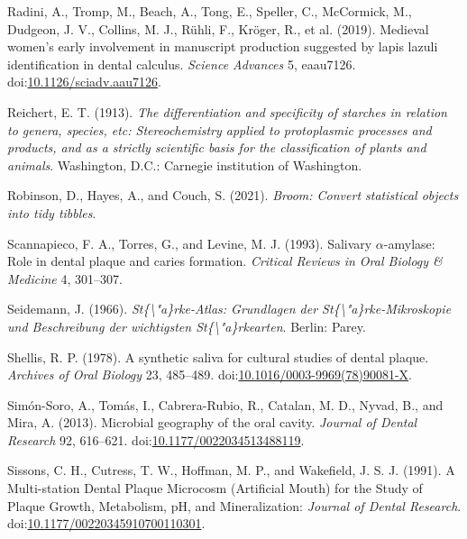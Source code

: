 \documentclass[utf8]{frontiers/frontiersSCNS}
\newlength{\cslhangindent}
\newlength{\cslentryspacingunit} %
\newenvironment{CSLReferences}[2] %
 {%
  \setlength{\parindent}{0pt}
  \ifodd #1
  \let\oldpar\par
  \def\par{\hangindent=\cslhangindent\oldpar}
  \fi
  \setlength{\parskip}{#2\cslentryspacingunit}
 }%
 {}
\begin{document}
\begin{CSLReferences}{1}{0}
\leavevmode{}%
Radini, A., Tromp, M., Beach, A., Tong, E., Speller, C., McCormick, M., Dudgeon, J. V., Collins, M. J., Rühli, F., Kröger, R., et al. (2019). Medieval women's early involvement in manuscript production suggested by lapis lazuli identification in dental calculus. \emph{Science Advances} 5, eaau7126. doi:\href{https://doi.org/10.1126/sciadv.aau7126}{10.1126/sciadv.aau7126}.

\leavevmode{}%
Reichert, E. T. (1913). \emph{The differentiation and specificity of starches in relation to genera, species, etc: Stereochemistry applied to protoplasmic processes and products, and as a strictly scientific basis for the classification of plants and animals}. {Washington, D.C.}: {Carnegie institution of Washington}.

\leavevmode{}%
Robinson, D., Hayes, A., and Couch, S. (2021). \emph{Broom: {Convert} statistical objects into tidy tibbles}.

\leavevmode{}%
Scannapieco, F. A., Torres, G., and Levine, M. J. (1993). Salivary {\(\alpha\)}-amylase: Role in dental plaque and caries formation. \emph{Critical Reviews in Oral Biology \& Medicine} 4, 301--307.

\leavevmode{}%
Seidemann, J. (1966). \emph{St\{\textbackslash"a\}rke-{Atlas}: {Grundlagen} der {St}\{\textbackslash"a\}rke-{Mikroskopie} und {Beschreibung} der wichtigsten {St}\{\textbackslash"a\}rkearten}. {Berlin}: {Parey}.

\leavevmode{}%
Shellis, R. P. (1978). A synthetic saliva for cultural studies of dental plaque. \emph{Archives of Oral Biology} 23, 485--489. doi:\href{https://doi.org/10.1016/0003-9969(78)90081-X}{10.1016/0003-9969(78)90081-X}.

\leavevmode{}%
Simón-Soro, A., Tomás, I., Cabrera-Rubio, R., Catalan, M. D., Nyvad, B., and Mira, A. (2013). Microbial geography of the oral cavity. \emph{Journal of Dental Research} 92, 616--621. doi:\href{https://doi.org/10.1177/0022034513488119}{10.1177/0022034513488119}.

\leavevmode{}%
Sissons, C. H., Cutress, T. W., Hoffman, M. P., and Wakefield, J. S. J. (1991). A {Multi-station Dental Plaque Microcosm} ({Artificial Mouth}) for the {Study} of {Plaque Growth}, {Metabolism}, {pH}, and {Mineralization}: \emph{Journal of Dental Research}. doi:\href{https://doi.org/10.1177/00220345910700110301}{10.1177/00220345910700110301}.


\end{CSLReferences}
\end{document}
